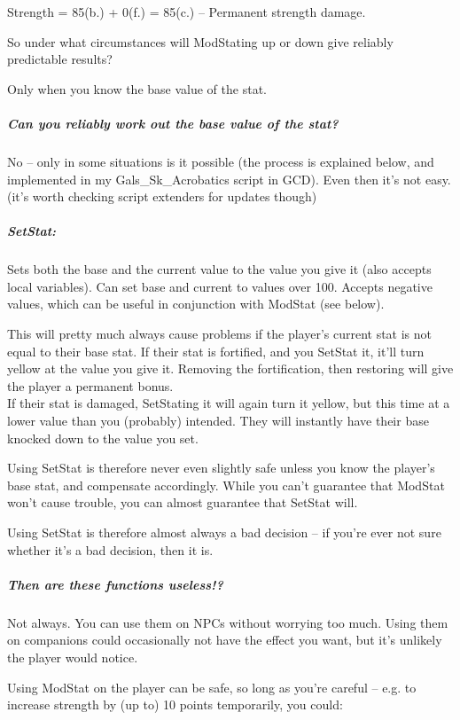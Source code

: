 \documentclass[
]{article}
\begin{document}
Strength = 85(b.) + 0(f.) = 85(c.) -- Permanent strength damage.

So under what circumstances will ModStating up or down give reliably
predictable results?

Only when you know the base value of the stat.

\hypertarget{can-you-reliably-work-out-the-base-value-of-the-stat}{%
\subparagraph{Can you reliably work out the base value of the
stat?}\label{can-you-reliably-work-out-the-base-value-of-the-stat}}

No -- only in some situations is it possible (the process is explained
below, and implemented in my Gals\_Sk\_Acrobatics script in GCD). Even
then it's not easy. (it's worth checking script extenders for updates
though)

\hypertarget{setstat}{%
\subparagraph{SetStat:}\label{setstat}}

Sets both the base and the current value to the value you give it (also
accepts local variables). Can set base and current to values over 100.
Accepts negative values, which can be useful in conjunction with ModStat
(see below).

This will pretty much always cause problems if the player's current stat
is not equal to their base stat. If their stat is fortified, and you
SetStat it, it'll turn yellow at the value you give it. Removing the
fortification, then restoring will give the player a permanent bonus.\\
If their stat is damaged, SetStating it will again turn it yellow, but
this time at a lower value than you (probably) intended. They will
instantly have their base knocked down to the value you set.

Using SetStat is therefore never even slightly safe unless you know the
player's base stat, and compensate accordingly. While you can't
guarantee that ModStat won't cause trouble, you can almost guarantee
that SetStat will.

Using SetStat is therefore almost always a bad decision -- if you're
ever not sure whether it's a bad decision, then it is.

\hypertarget{then-are-these-functions-useless}{%
\subparagraph{Then are these functions
useless!?}\label{then-are-these-functions-useless}}

Not always. You can use them on NPCs without worrying too much. Using
them on companions could occasionally not have the effect you want, but
it's unlikely the player would notice.

Using ModStat on the player can be safe, so long as you're careful --
e.g. to increase strength by (up to) 10 points temporarily, you could:
\end{document}
